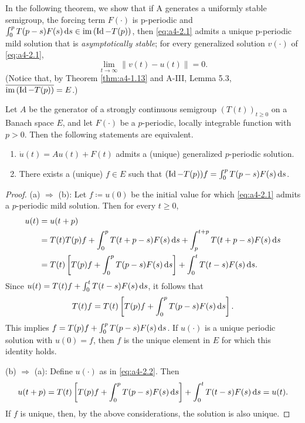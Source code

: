In the following theorem, we show that if A generates a
uniformly stable semigroup, the forcing term $F(\cdot)$ is p-periodic
and $\int_{0}^{p} T(p-s)F(s)  \mathop{}\!\mathrm{d}{s} \in \mathop{}\!\mathrm{im}\,(\operatorname{Id} - T(p))$, then \eqref{eq:a4-2.1}
 admits a unique p-periodic mild solution that is \emph{asymptotically stable}; \ie for every generalized solution $v(\cdot)$ of \eqref{eq:a4-2.1}, 
\[
\lim_{t \to \infty} \|v(t) - u(t)\| = 0.
\]  
(Notice that, by
Theorem \ref{thm:a4-1.13} and A-III, Lemma 5.3, $\overline{\mathop{}\!\mathrm{im}\,(\operatorname{Id} - T(p))} = E$.)
\begin{lemma}\label{lem:a4-2.2}
Let $A$ be the generator of a strongly continuous semigroup $(T(t))_{t \geq 0}$ on a Banach space $E$, and let $F(\cdot)$ be a $p$-periodic, locally integrable function with $p > 0$. 
Then the following statements are equivalent.
\begin{enumerate}[\upshape (a)]
\item 
$\dot{u}(t) = Au(t) + F(t)$ admits a (unique) generalized $p$-periodic solution.

\item 
There exists a (unique) $f \in E$ such that $(\operatorname{Id} - T(p))f = \int_{0}^{p} T(p-s)F(s)  \mathop{}\!\mathrm{d}{s}$.
\end{enumerate}
\end{lemma}
\begin{proof}
(a) $\Rightarrow$ (b): 
Let $f \coloneqq u(0)$ be the initial value for which \eqref{eq:a4-2.1} admits a $p$-periodic mild solution. 
Then for every $t\ge 0$,
\begin{align*}
u(t) &= u(t+p) \\
&= T(t)T(p)f + \int_{0}^{p} T(t+p-s)F(s)  \mathop{}\!\mathrm{d}{s} + \int_{p}^{t+p} T(t+p-s)F(s)  \mathop{}\!\mathrm{d}{s} \\
&= T(t)\left[T(p)f + \int_{0}^{p} T(p-s)F(s)  \mathop{}\!\mathrm{d}{s}\right] + \int_{0}^{t} T(t-s)F(s)  \mathop{}\!\mathrm{d}{s}.
\end{align*}
Since $u(t) = T(t)f+\int_0^t T(t-s)F(s)\mathop{}\!\mathrm{d}{s}$, it follows that
\[T(t)f = T(t)\left[T(p)f+\int_0^pT(p-s)F(s)\mathop{}\!\mathrm{d}{s}\right].\]
This implies $f = T(p)f + \int_{0}^{p} T(p-s)F(s)  \mathop{}\!\mathrm{d}{s}$.
If $u(\cdot)$ is a unique periodic solution with $u(0) = f$, then $f$ is the unique element in $E$ for which this identity holds.

(b) $\Rightarrow$ (a):  
Define $u(\cdot)$ as in \eqref{eq:a4-2.2}. 
Then
\begin{align*}
u(t+p) = T(t)\left[T(p)f + \int_{0}^{p} T(p-s)F(s)  \mathop{}\!\mathrm{d}{s}\right] + \int_{0}^{t} T(t-s)F(s)  \mathop{}\!\mathrm{d}{s} = u(t).
\end{align*}
If $f$ is unique, then, by the above considerations, the solution is also unique.
\end{proof}

